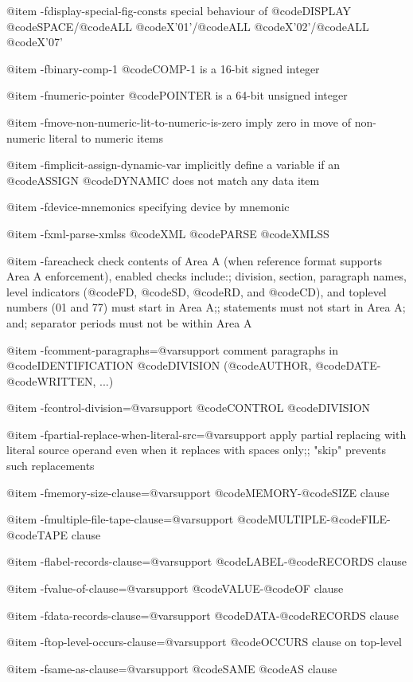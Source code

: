 @item -fdisplay-special-fig-consts
special behaviour of @code{DISPLAY} @code{SPACE}/@code{ALL} @code{X'01'}/@code{ALL} @code{X'02'}/@code{ALL} @code{X'07'}

@item -fbinary-comp-1
@code{COMP}-1 is a 16-bit signed integer

@item -fnumeric-pointer
@code{POINTER} is a 64-bit unsigned integer

@item -fmove-non-numeric-lit-to-numeric-is-zero
imply zero in move of non-numeric literal to numeric items

@item -fimplicit-assign-dynamic-var
implicitly define a variable if an @code{ASSIGN} @code{DYNAMIC} does not match any data item

@item -fdevice-mnemonics
specifying device by mnemonic

@item -fxml-parse-xmlss
@code{XML} @code{PARSE} @code{XMLSS}

@item -fareacheck
check contents of Area A (when reference format supports Area A enforcement),
enabled checks include:; division, section, paragraph names, level indicators (@code{FD}, @code{SD}, @code{RD}, and @code{CD}),
and toplevel numbers (01 and 77) must start in Area A;; statements must not start in Area A; and; separator periods must not be within Area A

@item -fcomment-paragraphs=@var{support}
comment paragraphs in @code{IDENTIFICATION} @code{DIVISION} (@code{AUTHOR}, @code{DATE}-@code{WRITTEN}, ...)

@item -fcontrol-division=@var{support}
@code{CONTROL} @code{DIVISION}

@item -fpartial-replace-when-literal-src=@var{support}
apply partial replacing with literal source operand even when it replaces with spaces only;; "skip" prevents such replacements

@item -fmemory-size-clause=@var{support}
@code{MEMORY}-@code{SIZE} clause

@item -fmultiple-file-tape-clause=@var{support}
@code{MULTIPLE}-@code{FILE}-@code{TAPE} clause

@item -flabel-records-clause=@var{support}
@code{LABEL}-@code{RECORDS} clause

@item -fvalue-of-clause=@var{support}
@code{VALUE}-@code{OF} clause

@item -fdata-records-clause=@var{support}
@code{DATA}-@code{RECORDS} clause

@item -ftop-level-occurs-clause=@var{support}
@code{OCCURS} clause on top-level

@item -fsame-as-clause=@var{support}
@code{SAME} @code{AS} clause

